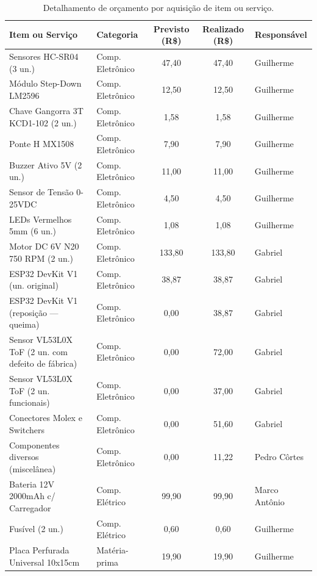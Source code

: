 \begin{landscape}
\begin{table}[H]
\centering
\small
\caption{Detalhamento de orçamento por aquisição de item ou serviço.}
\label{tab:orcamento_detalhado}
\renewcommand{\arraystretch}{1.3}
\begin{tabularx}{\linewidth}{|X|l|c|c|l|}
\hline
\textbf{Item ou Serviço} & \textbf{Categoria} & \textbf{Previsto (R\$)} & \textbf{Realizado (R\$)} & \textbf{Responsável} \\ \hline
Sensores HC-SR04 (3 un.) & Comp. Eletrônico & 47,40 & 47,40 & Guilherme \\ \hline
Módulo Step-Down LM2596 & Comp. Eletrônico & 12,50 & 12,50 & Guilherme \\ \hline
Chave Gangorra 3T KCD1-102 (2 un.) & Comp. Eletrônico & 1,58 & 1,58 & Guilherme \\ \hline
Ponte H MX1508 & Comp. Eletrônico & 7,90 & 7,90 & Guilherme \\ \hline
Buzzer Ativo 5V (2 un.) & Comp. Eletrônico & 11,00 & 11,00 & Guilherme \\ \hline
Sensor de Tensão 0-25VDC & Comp. Eletrônico & 4,50 & 4,50 & Guilherme \\ \hline
LEDs Vermelhos 5mm (6 un.) & Comp. Eletrônico & 1,08 & 1,08 & Guilherme \\ \hline
Motor DC 6V N20 750 RPM (2 un.) & Comp. Eletrônico & 133,80 & 133,80 & Gabriel \\ \hline
ESP32 DevKit V1 (un. original) & Comp. Eletrônico & 38,87 & 38,87 & Gabriel \\ \hline
ESP32 DevKit V1 (reposição — queima) & Comp. Eletrônico & 0,00 & 38,87 & Gabriel \\ \hline
Sensor VL53L0X ToF (2 un. com defeito de fábrica) & Comp. Eletrônico & 0,00 & 72,00 & Gabriel \\ \hline
Sensor VL53L0X ToF (2 un. funcionais) & Comp. Eletrônico & 0,00 & 37,00 & Gabriel \\ \hline
Conectores Molex e Switchers & Comp. Eletrônico & 0,00 & 51,60 & Gabriel \\ \hline
Componentes diversos (miscelânea) & Comp. Eletrônico & 0,00 & 11,22 & Pedro Côrtes \\ \hline
Bateria 12V 2000mAh c/ Carregador & Comp. Elétrico & 99,90 & 99,90 & Marco Antônio \\ \hline
Fusível (2 un.) & Comp. Elétrico & 0,60 & 0,60 & Guilherme \\ \hline
Placa Perfurada Universal 10x15cm & Matéria-prima & 19,90 & 19,90 & Guilherme \\ \hline

\end{tabularx}
\end{table}
\end{landscape}
